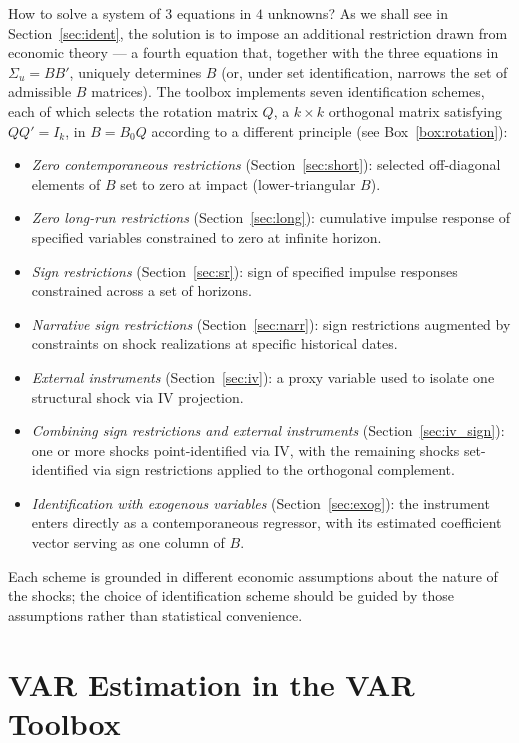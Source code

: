 \documentclass[12pt]{article}
\begin{document}
How to solve a system of $3$ equations in $4$ unknowns? As we shall see in Section~\ref{sec:ident}, the solution is to impose an additional restriction drawn from economic theory --- a fourth equation that, together with the three equations in $\Sigma_u = BB'$, uniquely determines $B$ (or, under set identification, narrows the set of admissible $B$ matrices). The toolbox implements seven identification schemes, each of which selects the rotation matrix $Q$, a $k\times k$ orthogonal matrix satisfying $QQ'=I_k$, in $B = B_0 Q$ according to a different principle (see Box~\ref{box:rotation}):
\begin{itemize}
    \item \textit{Zero contemporaneous restrictions} (Section~\ref{sec:short}): selected off-diagonal elements of $B$ set to zero at impact (lower-triangular $B$).
    \item \textit{Zero long-run restrictions} (Section~\ref{sec:long}): cumulative impulse response of specified variables constrained to zero at infinite horizon.
    \item \textit{Sign restrictions} (Section~\ref{sec:sr}): sign of specified impulse responses constrained across a set of horizons.
    \item \textit{Narrative sign restrictions} (Section~\ref{sec:narr}): sign restrictions augmented by constraints on shock realizations at specific historical dates.
    \item \textit{External instruments} (Section~\ref{sec:iv}): a proxy variable used to isolate one structural shock via IV projection.
    \item \textit{Combining sign restrictions and external instruments} (Section~\ref{sec:iv_sign}): one or more shocks point-identified via IV, with the remaining shocks set-identified via sign restrictions applied to the orthogonal complement.
    \item \textit{Identification with exogenous variables} (Section~\ref{sec:exog}): the instrument enters directly as a contemporaneous regressor, with its estimated coefficient vector serving as one column of $B$.
\end{itemize}

\noindent Each scheme is grounded in different economic assumptions about the nature of the shocks; the choice of identification scheme should be guided by those assumptions rather than statistical convenience.

\section{VAR Estimation in the VAR Toolbox}\label{sec:rfvar_toolbox}
\end{document}
